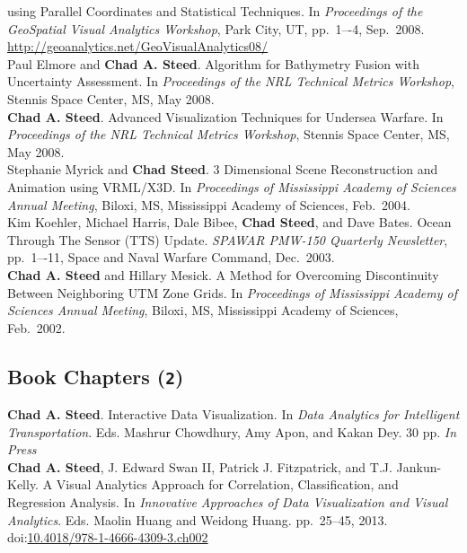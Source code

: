 \documentclass[11pt, letterpaper]{article}
\newcommand{\years}[1]{\marginnote{\scriptsize #1}}
\begin{document}
\begin{sloppypar}
using Parallel Coordinates and Statistical Techniques.  In \emph{Proceedings of
the GeoSpatial Visual Analytics Workshop}, Park City, UT, pp.\ 1–-4, Sep.\ 2008.
\href{http://geoanalytics.net/GeoVisualAnalytics08/}
{http://geoanalytics.net/GeoVisualAnalytics08/}\\
\years{2008}Paul Elmore and \textbf{Chad A. Steed}.  Algorithm for Bathymetry
Fusion with Uncertainty Assessment.  In \emph{Proceedings of the NRL Technical
Metrics Workshop}, Stennis Space Center, MS, May 2008.\\
\years{2008}\textbf{Chad A. Steed}.  Advanced Visualization Techniques for
Undersea Warfare. In \emph{Proceedings of the NRL Technical Metrics Workshop},
Stennis Space Center, MS, May 2008. \\
\years{2004}Stephanie Myrick and \textbf{Chad Steed}. 3 Dimensional Scene
Reconstruction and Animation using VRML/X3D.  In \emph{Proceedings of
Mississippi Academy of Sciences Annual Meeting}, Biloxi, MS, Mississippi
Academy of Sciences, Feb.\ 2004.\\
\years{2003}Kim Koehler, Michael Harris, Dale Bibee, \textbf{Chad Steed},
and Dave Bates.  Ocean Through The Sensor (TTS) Update.  \emph{SPAWAR PMW-150
Quarterly Newsletter}, pp.\ 1–-11, Space and Naval Warfare Command, Dec.\ 2003.\\
\years{2002}\textbf{Chad A. Steed} and Hillary Mesick. A Method for Overcoming
Discontinuity Between Neighboring UTM Zone Grids.  In \emph{Proceedings of
Mississippi Academy of Sciences Annual Meeting}, Biloxi, MS, Mississippi
Academy of Sciences, Feb.\ 2002.
\end{sloppypar}

\subsection*{Book Chapters (\texttt{2})}
\noindent\years{2016}\textbf{Chad A. Steed}. Interactive Data Visualization.
In \emph{Data Analytics for Intelligent Transportation}. Eds. Mashrur
Chowdhury, Amy Apon, and Kakan Dey. 30 pp.  \emph{In Press}\\
\years{2013}\textbf{Chad A. Steed}, J. Edward Swan II,
Patrick J. Fitzpatrick, and T.J. Jankun-Kelly.  A Visual Analytics Approach
for Correlation, Classification, and Regression Analysis. In \emph{Innovative Approaches
of Data Visualization and Visual Analytics}. Eds. Maolin Huang and Weidong Huang. pp.\ 25--45, 2013.
doi:\href{http://dx.doi.org/10.4018/978-1-4666-4309-3.ch002}{10.4018/978-1-4666-4309-3.ch002}
\end{document}
